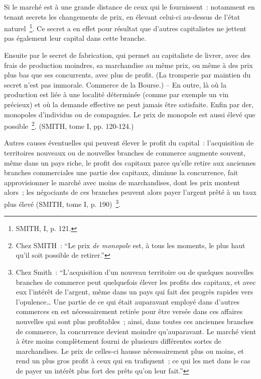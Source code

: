 \documentclass[french,twoside]{book} %
\newenvironment{quoteblock}%
  {\begin{quoting}}
  {\end{quoting}}
\newenvironment{quotebar}{%
    \def\FrameCommand{{\color{rubric!10!}\vrule width 0.5em} \hspace{0.9em}}%
    \def\OuterFrameSep{\itemsep} %
    \MakeFramed {\advance\hsize-\width \FrameRestore}
  }%
  {%
    \endMakeFramed
  }
\renewenvironment{quoteblock}%
  {%
    \savenotes
    \setstretch{0.9}
    \normalfont
    \begin{quotebar}
  }
  {%
    \end{quotebar}
    \spewnotes
  }
\begin{document}
\begin{quoteblock}
 \noindent Si le marché est à une grande distance de ceux qui le fournissent : notamment en tenant secrets les changements de prix, en élevant celui-ci au-dessus de l’état naturel \footnote{SMITH, I, p. 121.}. Ce secret a en effet pour résultat que d’autres capitalistes ne jettent pas également leur capital dans cette branche.\par
 Ensuite par le secret de fabrication, qui permet au capitaliste de livrer, avec des frais de production moindres, sa marchandise au même prix, ou même à des prix plus bas que ses concurrents, avec plus de profit. (La tromperie par maintien du secret n’est pas immorale. Commerce de la Bourse.) – En outre, là où la production est liée à une localité déterminée (comme par exemple un vin précieux) et où la demande effective ne peut jamais être satisfaite. Enfin par der, monopoles d’individus ou de compagnies. Le prix de monopole est aussi élevé que possible \footnote{Chez SMITH : “Le prix \emph{de monopole} est, à tous les moments, le plus haut qu’il soit possible de retirer.”}. (SMITH, tome I, pp. 120-124.)\par
 Autres causes éventuelles qui peuvent élever le profit du capital : l’acquisition de territoires nouveaux ou de nouvelles branches de commerce augmente souvent, même dans un pays riche, le profit des capitaux parce qu’elle retire aux anciennes branches commerciales une partie des capitaux, diminue la concurrence, fait approvisionner le marché avec moins de marchandises, dont les prix montent alors ; les négociants de ces branches peuvent alors payer l’argent prêté à un taux plus élevé (SMITH, tome I, p. 190) \footnote{Chez Smith : “L’acquisition d’un nouveau territoire ou de quelques nouvelles branches de commerce peut quelquefois élever les profits des capitaux, et avec eux l’intérêt de l’argent, même dans un pays qui fait des progrès rapides vers l’opulence… Une partie de ce qui était auparavant employé dans d’autres commerces en est nécessairement retirée pour être versée dans ces affaires nouvelles qui sont plus profitables ; ainsi, dans toutes ces anciennes branches de commerce, la concurrence devient moindre qu’auparavant. Le marché vient à être moins complètement fourni de plusieurs différentes sortes de marchandises. Le prix de celles-ci hausse nécessairement plus ou moins, et rend un plus gros profit à ceux qui en trafiquent ; ce qui les met dans le cas de payer un intérêt plus fort des prêts qu’on leur fait.”}.\par

\end{quoteblock}
\end{document}
